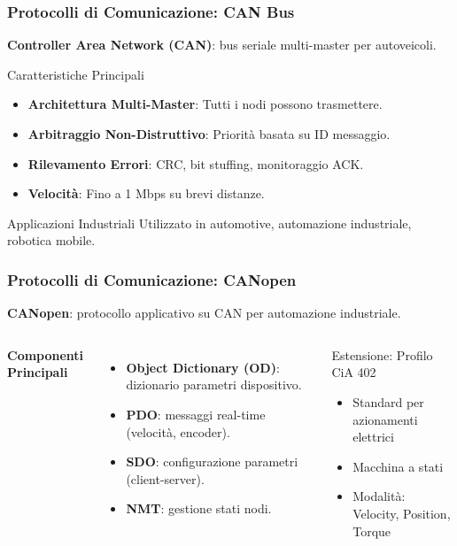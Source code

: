 \begin{frame}
    \frametitle{Protocolli di Comunicazione: CAN Bus}
    \textbf{Controller Area Network (CAN)}: bus seriale multi-master per autoveicoli.
    \begin{block}{Caratteristiche Principali}
        \begin{itemize}
            \item \textbf{Architettura Multi-Master}: Tutti i nodi possono trasmettere.
            \item \textbf{Arbitraggio Non-Distruttivo}: Priorità basata su ID messaggio.
            \item \textbf{Rilevamento Errori}: CRC, bit stuffing, monitoraggio ACK.
            \item \textbf{Velocità}: Fino a 1 Mbps su brevi distanze.
        \end{itemize}
    \end{block}

    \begin{block}{Applicazioni Industriali}
        Utilizzato in automotive, automazione industriale, robotica mobile.
    \end{block}
\end{frame}
\begin{frame}
    \frametitle{Protocolli di Comunicazione: CANopen}
    \textbf{CANopen}: protocollo applicativo su CAN per automazione industriale.\\

    \begin{columns}
        \textbf{Componenti Principali}
        \begin{itemize}
            \item \textbf{Object Dictionary (OD)}: dizionario parametri dispositivo.
            \item \textbf{PDO}: messaggi real-time (velocità, encoder).
            \item \textbf{SDO}: configurazione parametri (client-server).
            \item \textbf{NMT}: gestione stati nodi.
        \end{itemize}

        \begin{block}{Estensione: Profilo CiA 402}
            \begin{itemize}
                \item Standard per azionamenti elettrici
                \item Macchina a stati
                \item Modalità: Velocity, Position, Torque
            \end{itemize}
        \end{block}
    \end{columns}
\end{frame}

